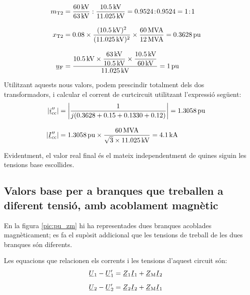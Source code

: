 \begin{exemple}[\MetodeCalculPU{}]
    \begin{align*}
       m\ped{T2} &= \frac{\qty{60}{kV}}{\qty{63}{kV}} : \frac{\qty{10,5}{kV}}{\qty{11,025}{kV}}
       = \num{0,9524}\!:\!\num{0,9524} = 1\!:\!1 \\[3mm]
       x\ped{T2} &= \num{0,08} \times \frac{(\qty{10,5}{kV})^2}{(\qty{11,025}{kV})^2 } \times
       \frac{\qty{60}{MVA}}{\qty{12}{MVA}}  = \qty{0,3628}{pu}\\[3mm]
       \cmplx{u}\ped{F} &= \frac{\qty{10,5}{kV} \times \dfrac{\qty{63}{kV}}{\qty{10,5}{kV}} \times
       \dfrac{\qty{10,5}{kV}}{\qty{60}{kV}}}{\qty{11,025}{kV}} = \qty{1}{pu}
    \end{align*}

    Utilitzant aquests nous valors, podem prescindir totalment dels dos
    transformadors, i calcular el corrent de curtcircuit utilitzant
    l'expressió següent:
    \begin{align*}
    |\cmplx{i}''\ped{cc}| &= \left| \frac{1}{j ( \num{0,3628} + \num{0,15} +
    \num{0,1330} + \num{0,12} )} \right| = \qty{1,3058}{pu} \\[3mm]
    |\cmplx{I}''\ped{cc}| &=
    \qty{1,3058}{pu}\times\frac{\qty{60}{MVA}}{\sqrt{3}\times \qty{11,025}{kV}} =
    \qty{4,1}{kA}
    \end{align*}

    Evidentment, el valor real final és el mateix independentment de quines
    siguin les tensions base escollides.
\end{exemple}

\subsection{Valors base per a branques que treballen a diferent tensió, amb acoblament magnètic}

En la figura \vref{pic:pu_zm} hi ha representades dues branques acoblades magnèticament; es fa el supòsit addicional que les tensions de treball de les dues branques són diferents.

\begin{center}
    
    \label{pic:pu_zm}
\end{center}

Les equacions que relacionen els corrents i les tensions d'aquest circuit són:
\begin{subequations}
\begin{align}
    \cmplx{U}_1 - \cmplx{U}'_1 &= \cmplx{Z}_1 \cmplx{I}_1 + \cmplx{Z}\ped{M} \cmplx{I}_2   \\[2mm]
    \cmplx{U}_2 - \cmplx{U}'_2 &= \cmplx{Z}_2 \cmplx{I}_2 + \cmplx{Z}\ped{M} \cmplx{I}_1
\end{align}
\end{subequations}


